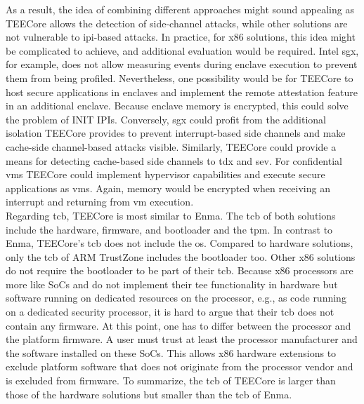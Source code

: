 As a result, the idea of combining different approaches might sound appealing as
TEECore allows the detection of side-channel attacks, while other solutions are
not vulnerable to \gls{ipi}-based attacks. In practice, for x86 solutions, this
idea might be complicated to achieve, and additional evaluation would be
required. Intel \gls{sgx}, for example, does not allow measuring events during
enclave execution to prevent them from being profiled. Nevertheless, one
possibility would be for TEECore to host secure applications in enclaves and
implement the remote attestation feature in an additional enclave. Because
enclave memory is encrypted, this could solve the problem of INIT IPIs.
Conversely, \gls{sgx} could profit from the additional isolation TEECore
provides to prevent interrupt-based side channels and make cache-side
channel-based attacks visible. Similarly, TEECore could provide a means for
detecting cache-based side channels to \gls{tdx} and \gls{sev}. For confidential
\glspl{vm} TEECore could implement hypervisor capabilities and execute secure
applications as \glspl{vm}. Again, memory would be encrypted when receiving an
interrupt and returning from \gls{vm} execution. \\

Regarding \gls{tcb}, TEECore is most similar to Enma. The \gls{tcb} of both
solutions include the hardware, firmware, and bootloader and the \gls{tpm}. In
contrast to Enma, TEECore's \gls{tcb} does not include the \gls{os}. Compared to
hardware solutions, only the \gls{tcb} of ARM TrustZone includes the bootloader
too. Other x86 solutions do not require the bootloader to be part of their
\gls{tcb}. Because x86 processors are more like SoCs and do not implement their
\gls{tee} functionality in hardware but software running on dedicated resources
on the processor, e.g., as code running on a dedicated security processor, it is
hard to argue that their \gls{tcb} does not contain any firmware. At this point,
one has to differ between the processor and the platform firmware. A user must
trust at least the processor manufacturer and the software installed on these
SoCs. This allows x86 hardware extensions to exclude platform software that does
not originate from the processor vendor and is excluded from firmware. To
summarize, the \gls{tcb} of TEECore is larger than those of the hardware
solutions but smaller than the \gls{tcb} of Enma.

\cleardoublepage

